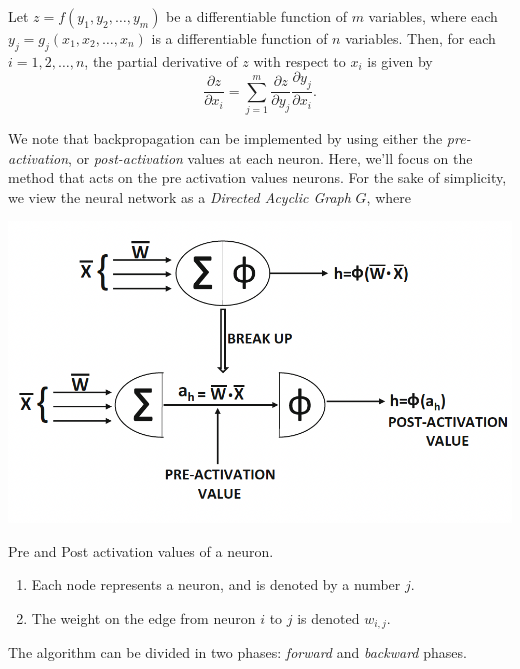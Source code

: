 \documentclass{tufte-handout}
\begin{document}
\begin{theorem} \label{chain}
    Let $z = f(y_1, y_2, \ldots, y_m)$ be a differentiable function of $m$ variables, where each $y_j = g_j(x_1, x_2, \ldots, x_n)$ is a differentiable function of $n$ variables. Then, for each $i = 1, 2, \ldots, n$, the partial derivative of $z$ with respect to $x_i$ is given by
$$
\frac{\partial z}{\partial x_i} = \sum_{j=1}^{m} \frac{\partial z}{\partial y_j} \frac{\partial y_j}{\partial x_i}.$$
  \end{theorem}
  We note that backpropagation can be implemented by using either the \textit{pre-activation}, or \textit{post-activation} values at each neuron. Here, we'll focus on the method that acts on the pre activation values neurons. For the sake of simplicity, we view the neural network as a \textit{Directed Acyclic Graph} $G$, where 
  \begin{marginfigure}
    \includegraphics{pre-post-neuron}  
    \caption{Pre and Post activation values of a neuron.}
  \end{marginfigure}
  \begin{enumerate}
    \item Each node represents a neuron, and is denoted by a number $j$.
    \item The weight on the edge from neuron $i$ to $j$ is denoted $w_{i,j}$.
  \end{enumerate}
  The algorithm can be divided in two phases: \textit{forward} and \textit{backward} phases.
\end{document}
